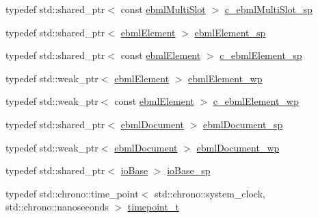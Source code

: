 \begin{DoxyCompactItemize}
\item 
typedef std\+::shared\+\_\+ptr$<$ const \mbox{\hyperlink{classebml_1_1ebmlMultiSlot}{ebml\+Multi\+Slot}} $>$ \mbox{\hyperlink{namespaceebml_a2b7466e45489d2a5dbfa29b411eb4ed0}{c\+\_\+ebml\+Multi\+Slot\+\_\+sp}}
\item 
typedef std\+::shared\+\_\+ptr$<$ \mbox{\hyperlink{classebml_1_1ebmlElement}{ebml\+Element}} $>$ \mbox{\hyperlink{namespaceebml_adad533b7705a16bb360fe56380c5e7be}{ebml\+Element\+\_\+sp}}
\item 
typedef std\+::shared\+\_\+ptr$<$ const \mbox{\hyperlink{classebml_1_1ebmlElement}{ebml\+Element}} $>$ \mbox{\hyperlink{namespaceebml_a2deef4e8071531b32e3533f1bf978917}{c\+\_\+ebml\+Element\+\_\+sp}}
\item 
typedef std\+::weak\+\_\+ptr$<$ \mbox{\hyperlink{classebml_1_1ebmlElement}{ebml\+Element}} $>$ \mbox{\hyperlink{namespaceebml_a495fb58b42b0050d887415351af02935}{ebml\+Element\+\_\+wp}}
\item 
typedef std\+::weak\+\_\+ptr$<$ const \mbox{\hyperlink{classebml_1_1ebmlElement}{ebml\+Element}} $>$ \mbox{\hyperlink{namespaceebml_abc218c2fc1444b2fd8a8a5fae67e0151}{c\+\_\+ebml\+Element\+\_\+wp}}
\item 
typedef std\+::shared\+\_\+ptr$<$ \mbox{\hyperlink{classebml_1_1ebmlDocument}{ebml\+Document}} $>$ \mbox{\hyperlink{namespaceebml_a66018942b568da5041136a945148b450}{ebml\+Document\+\_\+sp}}
\item 
typedef std\+::weak\+\_\+ptr$<$ \mbox{\hyperlink{classebml_1_1ebmlDocument}{ebml\+Document}} $>$ \mbox{\hyperlink{namespaceebml_acfead4f724a6f8d55c730c6fbd362cea}{ebml\+Document\+\_\+wp}}
\item 
typedef std\+::shared\+\_\+ptr$<$ \mbox{\hyperlink{classebml_1_1ioBase}{io\+Base}} $>$ \mbox{\hyperlink{namespaceebml_a7bb59128ac6af27e47367938a846b569}{io\+Base\+\_\+sp}}
\item 
typedef std\+::chrono\+::time\+\_\+point$<$ std\+::chrono\+::system\+\_\+clock, std\+::chrono\+::nanoseconds $>$ \mbox{\hyperlink{namespaceebml_a7e667ec3fe8b51fb5b8f9690734d8638}{timepoint\+\_\+t}}
\end{DoxyCompactItemize}
